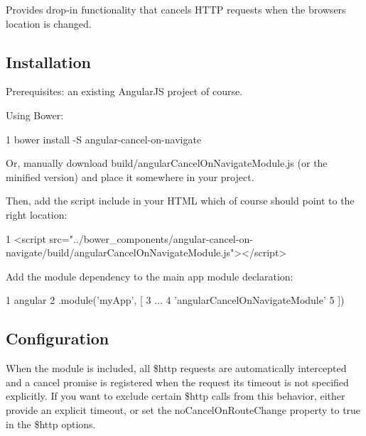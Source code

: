 Provides drop-\/in functionality that cancels H\+T\+T\+P requests when the browser\textquotesingle{}s location is changed.

\subsection*{Installation}

Prerequisites\+: an existing Angular\+J\+S project of course.

Using Bower\+:


\begin{DoxyCode}
1 bower install -S angular-cancel-on-navigate
\end{DoxyCode}


Or, manually download {\ttfamily build/angular\+Cancel\+On\+Navigate\+Module.\+js} (or the minified version) and place it somewhere in your project.

Then, add the script include in your H\+T\+M\+L which of course should point to the right location\+:


\begin{DoxyCode}
1 <script
       src="../bower\_components/angular-cancel-on-navigate/build/angularCancelOnNavigateModule.js"></script>
\end{DoxyCode}


Add the module dependency to the main app module declaration\+:


\begin{DoxyCode}
1 angular
2   .module('myApp', [
3     ...
4     'angularCancelOnNavigateModule'
5   ])
\end{DoxyCode}


\subsection*{Configuration}

When the module is included, all \$http requests are automatically intercepted and a cancel promise is registered when the request its timeout is not specified explicitly. If you want to exclude certain \$http calls from this behavior, either provide an explicit timeout, or set the {\ttfamily no\+Cancel\+On\+Route\+Change} property to {\ttfamily true} in the \$http options. 